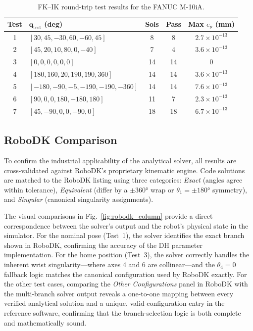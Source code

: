 \documentclass[conference]{IEEEtran}
\begin{document}
\begin{table}[t]
\centering
\caption{FK--IK round-trip test results for the FANUC M-10iA.}
\label{tab:iktests}
\begin{tabular}{c l c c c}
\toprule
Test & $\mathbf{q}_{\mathrm{test}}$ (deg) & Sols & Pass & Max $e_p$ (mm)\\
\midrule
1 & $[30,45,{-30},60,{-60},45]$               &  8 &  8 & $2.7{\times}10^{-13}$ \\
2 & $[45,20,10,80,0,{-40}]$                   &  7 &  4 & $3.6{\times}10^{-13}$ \\
3 & $[0,0,0,0,0,0]$                            & 14 & 14 & $0$ \\
4 & $[180,160,20,190,190,360]$                 & 14 & 14 & $3.6{\times}10^{-13}$ \\
5 & $[{-180},{-90},{-5},{-190},{-190},{-360}]$ & 14 & 14 & $7.6{\times}10^{-13}$ \\
6 & $[90,0,0,180,{-180},180]$                  & 11 &  7 & $2.3{\times}10^{-13}$ \\
7 & $[45,{-90},0,0,{-90},0]$                  & 18 & 18 & $6.7{\times}10^{-13}$ \\
\bottomrule
\end{tabular}
\end{table}

\subsection{RoboDK Comparison}
To confirm the industrial applicability of the analytical solver, all results are cross-validated against RoboDK's proprietary kinematic engine.
Code solutions are matched to the RoboDK listing using three categories: \emph{Exact} (angles agree within tolerance), \emph{Equivalent} (differ by a $\pm360°$ wrap or $\theta_1 = \pm180°$ symmetry), and \emph{Singular} (canonical singularity assignments).

The visual comparisons in Fig.~\ref{fig:robodk_column} provide a direct correspondence between the solver's output and the robot's physical state in the simulator.
For the nominal pose (Test~1), the solver identifies the exact branch shown in RoboDK, confirming the accuracy of the DH parameter implementation.
For the home position (Test~3), the solver correctly handles the inherent wrist singularity---where axes 4 and 6 are collinear---and the $\theta_4 = 0$ fallback logic matches the canonical configuration used by RoboDK exactly.
For the other test cases, comparing the \emph{Other Configurations} panel in RoboDK with the multi-branch solver output reveals a one-to-one mapping between every verified analytical solution and a unique, valid configuration entry in the reference software, confirming that the branch-selection logic is both complete and mathematically sound.
\end{document}
